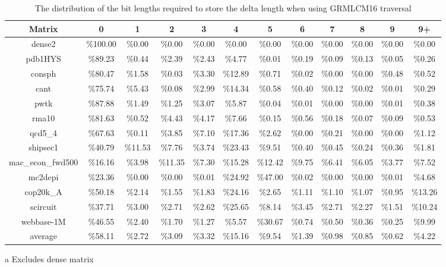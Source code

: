 \begin{sidewaystable}
\centering
\begin{threeparttable}
\caption{The distribution of the bit lengths required to store the delta length when using GRMLCM16 traversal}
\label{tbl:indexDist}
\begin{tabular}{cccccccccccc}
\hline
\bfseries Matrix & \bfseries 0 & \bfseries 1 & \bfseries 2 & \bfseries 3 & \bfseries 4 & \bfseries 5 & \bfseries 6 &\bfseries 7 & \bfseries 8 & \bfseries 9 & \bfseries 9+\\
\hline
dense2 & \%100.00 & \%0.00 & \%0.00 & \%0.00 & \%0.00 & \%0.00 & \%0.00 & \%0.00 & \%0.00 & \%0.00 & \%0.00\\
pdb1HYS & \%89.23 & \%0.44 & \%2.39 & \%2.43 & \%4.77 & \%0.01 & \%0.19 & \%0.09 & \%0.13 & \%0.05 & \%0.26\\
consph & \%80.47 & \%1.58 & \%0.03 & \%3.30 & \%12.89 & \%0.71 & \%0.02 & \%0.00 & \%0.00 & \%0.48 & \%0.52\\
cant & \%75.74 & \%5.43 & \%0.08 & \%2.99 & \%14.34 & \%0.58 & \%0.40 & \%0.12 & \%0.02 & \%0.01 & \%0.29\\
pwtk & \%87.88 & \%1.49 & \%1.25 & \%3.07 & \%5.87 & \%0.04 & \%0.01 & \%0.00 & \%0.00 & \%0.01 & \%0.38\\
rma10 & \%81.63 & \%0.52 & \%4.43 & \%4.17 & \%7.66 & \%0.15 & \%0.56 & \%0.18 & \%0.07 & \%0.09 & \%0.53\\
qcd5\_4 & \%67.63 & \%0.11 & \%3.85 & \%7.10 & \%17.36 & \%2.62 & \%0.00 & \%0.21 & \%0.00 & \%0.00 & \%1.12\\
shipsec1 & \%40.79 & \%11.53 & \%7.76 & \%3.74 & \%23.43 & \%9.51 & \%0.40 & \%0.45 & \%0.24 & \%0.36 & \%1.81\\
mac\_econ\_fwd500 & \%16.16 & \%3.98 & \%11.35 & \%7.30 & \%15.28 & \%12.42 & \%9.75 & \%6.41 & \%6.05 & \%3.77 & \%7.52\\
mc2depi & \%23.36 & \%0.00 & \%0.00 & \%0.01 & \%24.92 & \%47.00 & \%0.02 & \%0.00 & \%0.00 & \%0.01 & \%4.68\\
cop20k\_A & \%50.18 & \%2.14 & \%1.55 & \%1.83 & \%24.16 & \%2.65 & \%1.11 & \%1.10 & \%1.07 & \%0.95 & \%13.26\\
scircuit & \%37.71 & \%3.00 & \%2.71 & \%2.62 & \%25.65 & \%8.14 & \%3.45 & \%2.71 & \%2.27 & \%1.51 & \%10.24\\
webbase-1M & \%46.55 & \%2.40 & \%1.70 & \%1.27 & \%5.57 & \%30.67 & \%0.74 & \%0.50 & \%0.36 & \%0.25 & \%9.99\\
\hline
average\tnote{a} & \%58.11 & \%2.72 & \%3.09 & \%3.32 & \%15.16 & \%9.54 & \%1.39 & \%0.98 & \%0.85 & \%0.62 & \%4.22\\

\hline
\end{tabular}
\begin{tablenotes}
\item [a] Excludes dense matrix
\end{tablenotes}
\end{threeparttable}
\end{sidewaystable}%
